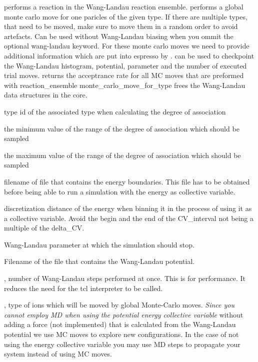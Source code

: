  performs a reaction in the Wang-Landau reaction ensemble.
 performs a global monte carlo move for one paricles of the given type. If there are multiple types, that need to be moved, make sure to move them in a random order to avoid artefacts. Can be used without Wang-Landau biasing when you ommit the
optional wang-landau keyword. For these monte carlo moves we need to provide
additional information which are put into espresso by . 
 can be used to checkpoint the Wang-Landau histogram, potential, parameter and the number of executed trial moves.
 returns the acceptrance rate for all MC moves that are preformed with reaction\_ensemble monte\_carlo\_move\_for\_type
 frees the Wang-Landau data structures in the core.

\begin{arguments}
\item[\var{associated\_type}] type id of the associated type when calculating the degree of association
\item[\var{min\_value}] the minimum value of the range of the degree of association which should be sampled
\item[\var{max\_value}] the maximum value of the range of the degree of association which should be sampled
\item[\var{list\_of\_corresponding\_types}] 
\item[\var{energy\_boundary\_filename}] filename of file that contains the energy boundaries. This file has to be obtained before being able to run a simulation with the energy as collective variable.
\item[\var{Delta\_E}] discretization distance of the energy when binning it in the process of using it as a collective variable. Avoid the begin and the end of the CV\_interval not being a multiple of the delta\_CV.
\item[\var{final\_wang\_landau\_parameter}] Wang-Landau parameter at which the simulation should stop.
\item[\var{full\_path\_to\_output\_filename}] Filename of the file that contains the Wang-Landau potential.
\item[\var{wang\_landau\_setps}], number of Wang-Landau steps performed at once. This is for performance. It reduces the need for the tcl interpreter to be called.
\item[\var{counter\_ion\_type}], type of ions which will be moved by global Monte-Carlo moves. \textit{Since you cannot employ MD when using the potential energy collective variable} without adding a force (not implemented) that is calculated from the Wang-Landau potential we use MC moves to explore new configurations. In the case of not using the energy collective variable you may use MD steps to propagate your system instead of using MC moves.

\end{arguments}
